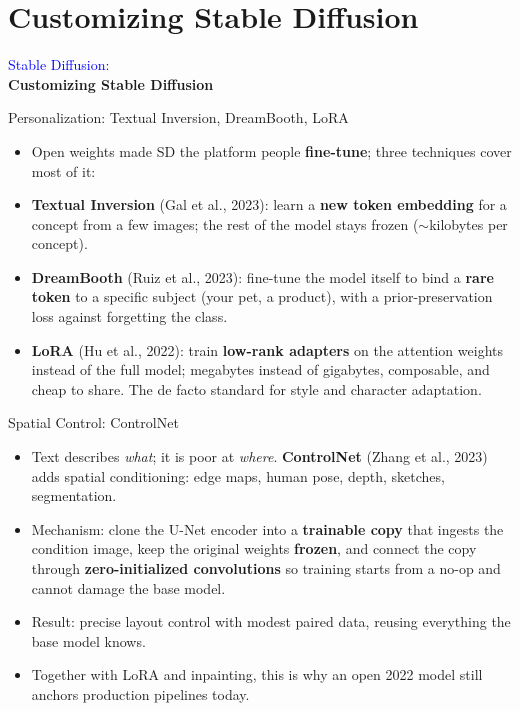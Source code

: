 \section{Customizing Stable Diffusion}
\begin{frame}[plain]
    \centering
    \vspace{2cm}
    {\Huge \textcolor{blue}{Stable Diffusion:}\\[1em]
     \textbf{Customizing Stable Diffusion}}
\end{frame}

\begin{frame}{Personalization: Textual Inversion, DreamBooth, LoRA}
  \begin{itemize}\itemsep0.3em
    \item Open weights made SD the platform people \textbf{fine-tune}; three techniques cover most of it:
    \item \textbf{Textual Inversion} (Gal et al., 2023): learn a \textbf{new token embedding} for a concept from a few images; the rest of the model stays frozen ($\sim$kilobytes per concept).
    \item \textbf{DreamBooth} (Ruiz et al., 2023): fine-tune the model itself to bind a \textbf{rare token} to a specific subject (your pet, a product), with a prior-preservation loss against forgetting the class.
    \item \textbf{LoRA} (Hu et al., 2022): train \textbf{low-rank adapters} on the attention weights instead of the full model; megabytes instead of gigabytes, composable, and cheap to share. The de facto standard for style and character adaptation.
  \end{itemize}
\end{frame}




\begin{frame}{Spatial Control: ControlNet}
  \begin{itemize}\itemsep0.3em
    \item Text describes \emph{what}; it is poor at \emph{where}. \textbf{ControlNet} (Zhang et al., 2023) adds spatial conditioning: edge maps, human pose, depth, sketches, segmentation.
    \item Mechanism: clone the U-Net encoder into a \textbf{trainable copy} that ingests the condition image, keep the original weights \textbf{frozen}, and connect the copy through \textbf{zero-initialized convolutions} so training starts from a no-op and cannot damage the base model.
    \item Result: precise layout control with modest paired data, reusing everything the base model knows.
    \item Together with LoRA and inpainting, this is why an open 2022 model still anchors production pipelines today.
  \end{itemize}
\end{frame}
